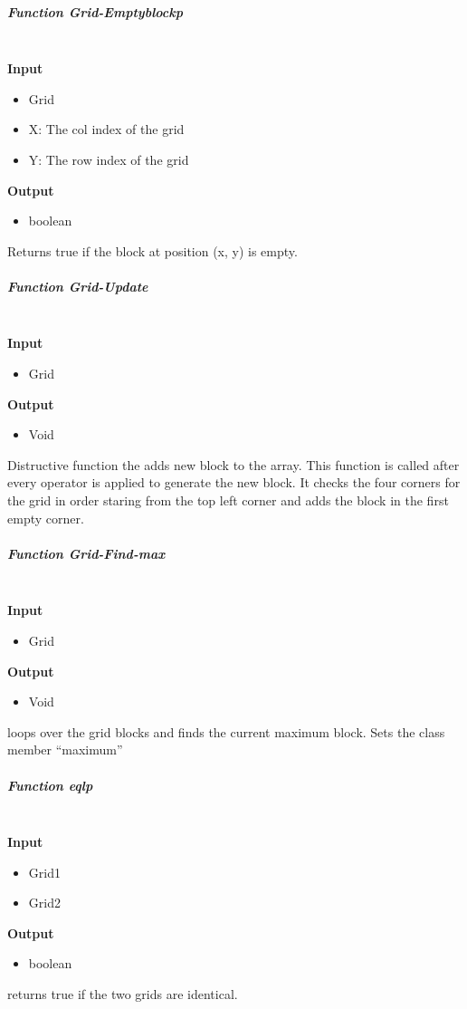 \documentclass[paper=a4, fontsize=11pt]{scrartcl}
\numberwithin{equation}{section}		%
\numberwithin{figure}{section}			%
\numberwithin{table}{section}				%
\begin{document}
\subparagraph{Function Grid-Emptyblockp } \mbox{} \\
\noindent\textbf{Input}
\begin{itemize}
    \item Grid
    \item X: The col index of the grid 
    \item Y: The row index of the grid
\end{itemize}
\noindent\textbf{Output}
\begin{itemize}
    \item boolean
\end{itemize}
Returns true if the block at position (x, y) is empty.

\subparagraph{Function Grid-Update } \mbox{} \\
\noindent\textbf{Input}
\begin{itemize}
    \item Grid
\end{itemize}
\noindent\textbf{Output}
\begin{itemize}
    \item Void
\end{itemize}
Distructive function the adds new block to the array. This function is called after every operator is applied to generate the new block. It checks the four corners for the grid in order staring from the top left corner and adds the block in the first empty corner.

\subparagraph{Function Grid-Find-max } \mbox{} \\
\noindent\textbf{Input}
\begin{itemize}
    \item Grid
\end{itemize}
\noindent\textbf{Output}
\begin{itemize}
    \item Void
\end{itemize}
loops over the grid blocks and finds the current maximum block. Sets the class member ``maximum''

\subparagraph{Function eqlp } \mbox{} \\
\noindent\textbf{Input}
\begin{itemize}
    \item Grid1
    \item Grid2
\end{itemize}
\noindent\textbf{Output}
\begin{itemize}
    \item boolean
\end{itemize}
returns true if the two grids are identical.
\end{document}
